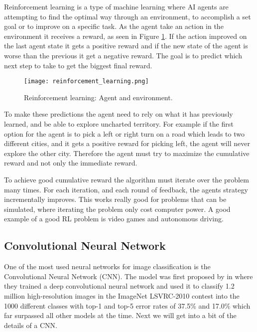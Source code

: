 \documentclass[thesis.tex]{subfiles}
\begin{document}
Reinforcement learning is a type of machine learning where AI agents are attempting to find the optimal way through an environment, to accomplish a set goal or to improve on a specific task. As the agent take an action in the environment it receives a reward, as seen in Figure \ref{fig:reinforcement_learning}. If the action improved on the last agent state it gets a positive reward and if the new state of the agent is worse than the previous it get a negative reward. The goal is to predict which next step to take to get the biggest final reward.

\begin{figure}[h] %
  \begin{center}
    \texttt{[image: reinforcement\_learning.png]}
    \caption[Reinforcement learning: Agent and environment.]{Reinforcement learning: Agent and environment.}
    \label{fig:reinforcement_learning}
  \end{center}
\end{figure}

To make these predictions the agent need to rely on what it has previously learned, and be able to explore uncharted territory. For example if the first option for the agent is to pick a left or right turn on a road which leads to two different cities, and it gets a positive reward for picking left, the agent will never explore the other city. Therefore the agent must try to maximize the cumulative reward and not only the immediate reward.

To achieve good cumulative reward the algorithm must iterate over the problem many times. For each iteration, and each round of feedback, the agents strategy incrementally improves. This works really good for problems that can be simulated, where iterating the problem only cost computer power. A good example of a good RL problem is video games and autonomous driving.


\subsection{Convolutional Neural Network} \label{convolutional_neural_network}
One of the most used neural networks for image classification is the Convolutional Neural Network (CNN). The model was first proposed by \citeauthor*{ImageNetClassification12} in \citeyear{ImageNetClassification12} \cite{ImageNetClassification12} where they trained a deep convolutional neural network and used it to classify 1.2 million high-resolution images in the ImageNet LSVRC-2010 contest into the 1000 different classes with top-1 and top-5 error rates of 37.5\% and 17.0\% which far surpassed all other models at the time. Next we will get into a bit of the details of a CNN.
\end{document}

